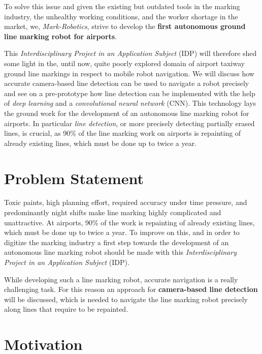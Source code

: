 To solve this issue and given the existing but outdated tools in the marking industry, the unhealthy working conditions, and the worker shortage in the market, we, \emph{Mark-Robotics}, strive to develop the \textbf{first autonomous ground line marking robot for airports}.

This \emph{Interdisciplinary Project in an Application Subject} (IDP) will therefore shed some light in the, until now, quite poorly explored domain of airport taxiway ground line markings in respect to mobile robot navigation. We will discuss how accurate camera-based line detection can be used to navigate a robot precisely and see on a pre-prototype how line detection can be implemented with the help of \emph{deep learning} and a \emph{convolutional neural network} (CNN). This technology lays the ground work for the development of an autonomous line marking robot for airports. In particular \emph{line detection}, or more precisely detecting partially erased lines, is crucial, as 90\% of the line marking work on airports is repainting of already existing lines, which must be done up to twice a year. 

\section{Problem Statement}
\label{sec:introduction-problem-statement}

Toxic paints, high planning effort, required accuracy under time pressure, and predominantly night shifts make line marking highly complicated and unattractive. At airports, 90\% of the work is repainting of already existing lines, which must be done up to twice a year. To improve on this, and in order to digitize the marking industry a first step towards the development of an autonomous line marking robot should be made with this \emph{Interdisciplinary Project in an Application Subject} (IDP).

While developing such a line marking robot, accurate navigation is a really challenging task. For this reason an approach for \textbf{camera-based line detection} will be discussed, which is needed to navigate the line marking robot precisely along lines that require to be repainted.

\newpage

\section{Motivation}
\label{sec:introduction-motivation}

